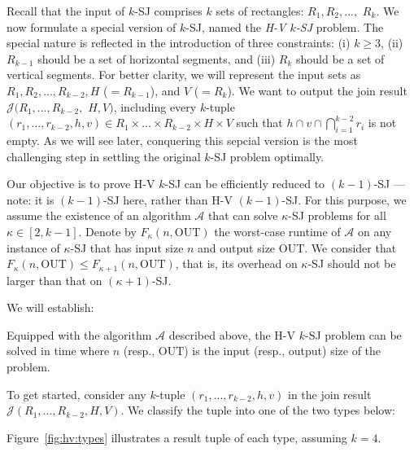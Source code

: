 \documentclass[sigconf]{acmart}
\def\vgap{\vspace{1mm}}
\def\A{\mathcal{A}}
\def\J{\mathcal{J}}
\def\out{\mathrm{OUT}}
\begin{document}
Recall that the input of $k$-SJ comprises $k$ sets of rectangles: $R_1, R_2, ...,$ $R_k$. We now formulate a special version of $k$-SJ, named the {\em H-V $k$-SJ} problem. The special nature is reflected in the introduction of three constraints: (i) $k \ge 3$, (ii) $R_{k-1}$ should be a set of horizontal segments, and (iii) $R_k$ should be a set of vertical segments. For better clarity, we will represent the input sets as $R_1, R_2, ..., R_{k-2}, H$ ($=R_{k-1}$), and $V$ ($=R_k$). We want to output the join result $\J(R_1, ..., R_{k-2},$ $H, V)$, including every $k$-tuple $(r_1, ..., r_{k-2}, h, v) \in R_1 \times ... \times R_{k-2} \times H \times V$ such that $h \cap v \cap \bigcap_{i=1}^{k-2} r_i$ is not empty. As we will see later, conquering this sepcial version is the most challenging step in settling the original $k$-SJ problem optimally.

\vgap

Our objective is to prove H-V $k$-SJ can be efficiently reduced to $(k-1)$-SJ --- note: it is $(k-1)$-SJ here, rather than H-V $(k-1)$-SJ. For this purpose, we assume the existence of an algorithm $\A$ that can solve $\kappa$-SJ problems for all $\kappa \in [2, k-1]$. Denote by $F_\kappa(n, \out)$ the worst-case runtime of $\A$ on any instance of $\kappa$-SJ that has input size $n$ and output size $\out$. We consider that $F_\kappa(n, \out) \le F_{\kappa + 1}(n, \out)$, that is, its overhead on $\kappa$-SJ should not be larger than that on $(\kappa+1)$-SJ.

\vgap

We will establish:

\begin{lemma} \label{lmm:hv}
    Equipped with the algorithm $\A$ described above, the H-V $k$-SJ problem can be solved in time
    \myeqn{
        O(k) \cdot \big( F_{k-1}(n, \out) + n\log n + k \cdot \out \big) \nn
    }
    where $n$ (resp., $\out$) is the input (resp., output) size of the problem.
\end{lemma}



To get started, consider any $k$-tuple $(r_1, ..., r_{k-2}, h, v)$ in the join result $\J(R_1, ..., R_{k-2}, H, V)$. We classify the tuple into one of the two types below:

Figure~\ref{fig:hv:types} illustrates a result tuple of each type, assuming $k = 4$.
\end{document}
